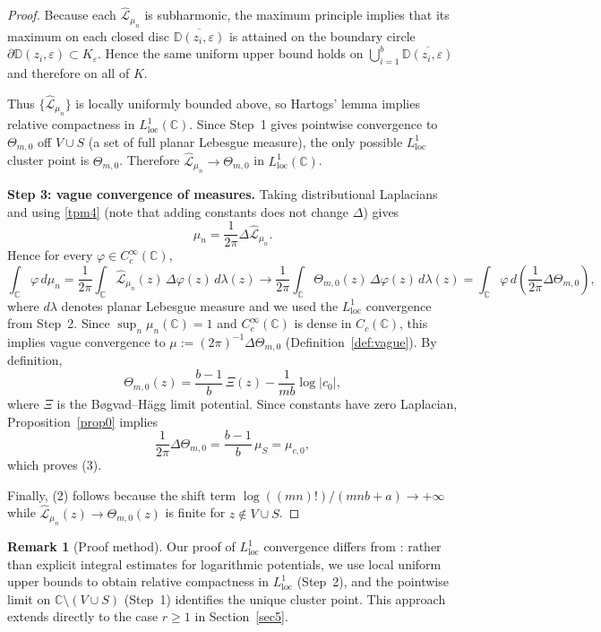 \documentclass[12pt]{article}
\theoremstyle{plain}
\theoremstyle{definition}
\newtheorem{remark}[theorem]{Remark}
\begin{document}
\begin{proof}
Because each $\widehat{\mathcal L}_{\mu_n}$ is subharmonic, the maximum principle implies that its maximum on each closed disc $\overline{\mathbb{D}(z_i,\varepsilon)}$ is attained on the boundary circle $\partial\mathbb{D}(z_i,\varepsilon)\subset K_\varepsilon$.
Hence the same uniform upper bound holds on $\bigcup_{i=1}^b\overline{\mathbb{D}(z_i,\varepsilon)}$ and therefore on all of $K$.

Thus $\{\widehat{\mathcal L}_{\mu_n}\}$ is locally uniformly bounded above, so Hartogs' lemma \cite[Theorem~4.1.9]{Hormander} implies relative compactness in $L^1_{\mathrm{loc}}(\mathbb C)$.
Since Step~1 gives pointwise convergence to $\Theta_{m,0}$ off $V\cup S$ (a set of full planar Lebesgue measure), the only possible $L^1_{\mathrm{loc}}$ cluster point is $\Theta_{m,0}$.
Therefore $\widehat{\mathcal L}_{\mu_n}\to\Theta_{m,0}$ in $L^1_{\mathrm{loc}}(\mathbb C)$.

\smallskip
\noindent\textbf{Step 3: vague convergence of measures.}
Taking distributional Laplacians and using \eqref{tpm4} (note that adding constants does not change $\Delta$) gives
$$\mu_n=\frac{1}{2\pi}\Delta\widehat{\mathcal L}_{\mu_n}.$$
Hence for every $\varphi\in C_c^\infty(\mathbb C)$,
$$\int_{\mathbb C}\varphi\,d\mu_n
=\frac{1}{2\pi}\int_{\mathbb C}\widehat{\mathcal L}_{\mu_n}(z)\,\Delta\varphi(z)\,d\lambda(z)
\longrightarrow
\frac{1}{2\pi}\int_{\mathbb C}\Theta_{m,0}(z)\,\Delta\varphi(z)\,d\lambda(z)
=\int_{\mathbb C}\varphi\,d\left(\frac{1}{2\pi}\Delta\Theta_{m,0}\right),$$
where $d\lambda$ denotes planar Lebesgue measure and we used the $L^1_{\mathrm{loc}}$ convergence from Step~2.
Since $\sup_n\mu_n(\mathbb C)=1$ and $C_c^\infty(\mathbb C)$ is dense in $C_c(\mathbb C)$, this implies vague convergence to $\mu:=(2\pi)^{-1}\Delta\Theta_{m,0}$ (Definition~\ref{def:vague}).
By definition,
$$\Theta_{m,0}(z)=\frac{b-1}{b}\,\Xi(z)-\frac{1}{mb}\log|c_0|,$$
where $\Xi$ is the B\o gvad--H\"agg limit potential.
Since constants have zero Laplacian, Proposition~\ref{prop0} implies
$$\frac{1}{2\pi}\Delta\Theta_{m,0}=\frac{b-1}{b}\,\mu_S=\mu_{c,0},$$
which proves (3).

Finally, (2) follows because the shift term $\log((mn)!)/(mnb+a)\to+\infty$ while $\widehat{\mathcal L}_{\mu_n}(z)\to\Theta_{m,0}(z)$ is finite for $z\notin V\cup S$.
\end{proof}

\begin{remark}[Proof method]\label{rem:L1loc_method}
Our proof of $L^1_{\mathrm{loc}}$ convergence differs from \cite{B:H,Hagg}: rather than explicit integral estimates for logarithmic potentials, we use local uniform upper bounds to obtain relative compactness in $L^1_{\mathrm{loc}}$ (Step~2), and the pointwise limit on $\mathbb C\setminus(V\cup S)$ (Step~1) identifies the unique cluster point.
This approach extends directly to the case $r\ge1$ in Section~\ref{sec5}.
\end{remark}
\end{document}
